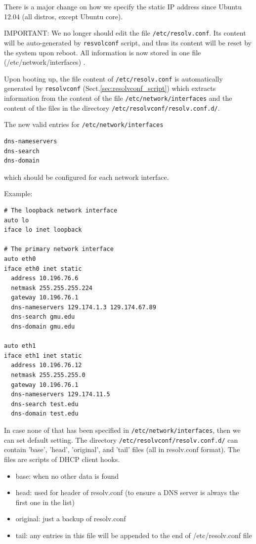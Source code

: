 There is a major change on how we specify the static IP address since Ubuntu
12.04 (all distros, except Ubuntu core). 

IMPORTANT: We no longer should edit the file \verb!/etc/resolv.conf!. Its
content will be auto-generated by \verb!resvolconf! script, and thus its content
will be reset by the system upon reboot. All information is now stored in one
file (/etc/network/interfaces) .

Upon booting up, the file content of \verb!/etc/resolv.conf! is automatically
generated by \verb!resolvconf! (Sect.\ref{sec:resolvconf_script}) which extracts
information from the content of the file \verb!/etc/network/interfaces! and the
content of the files in the directory \verb!/etc/resolvconf/resolv.conf.d/!.



The new valid entries  for \verb!/etc/network/interfaces!
\begin{verbatim}
dns-nameservers
dns-search
dns-domain
\end{verbatim}
which should be configured for each network interface.

Example:
\begin{verbatim}
# The loopback network interface
auto lo
iface lo inet loopback

# The primary network interface
auto eth0
iface eth0 inet static
  address 10.196.76.6
  netmask 255.255.255.224
  gateway 10.196.76.1
  dns-nameservers 129.174.1.3 129.174.67.89
  dns-search gmu.edu
  dns-domain gmu.edu

auto eth1
iface eth1 inet static
  address 10.196.76.12
  netmask 255.255.255.0
  gateway 10.196.76.1
  dns-nameservers 129.174.11.5
  dns-search test.edu
  dns-domain test.edu

\end{verbatim}

In case none of that has been specified in \verb!/etc/network/interfaces!, then
we can set default setting. The directory \verb!/etc/resolvconf/resolv.conf.d/!
can contain 'base', 'head', 'original', and 'tail' files (all in resolv.conf
format). The files are scripts of DHCP client hooks.
\begin{itemize}
  \item base: when no other data is found
  \item head: used for header of resolv.conf (to ensure a DNS server is always
  the first one in the list)
  \item original: just a backup of resolv.conf
  \item tail: any entries in this file will be appended to the end of
  /etc/resolv.conf file
\end{itemize}

